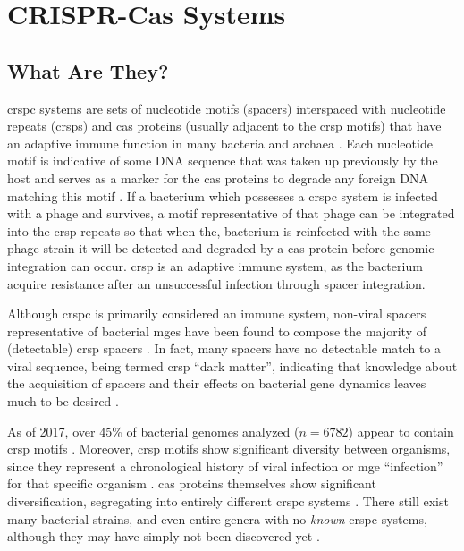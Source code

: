 \section{CRISPR-Cas Systems}
\subsection{What Are They?}
\ac{crspc} systems are sets of nucleotide motifs (spacers) interspaced with nucleotide repeats (\ac{crsp}s) and \ac{cas} proteins (usually adjacent to the \ac{crsp} motifs) that have an adaptive immune function in many bacteria and archaea \citep{crispgen}.
Each nucleotide motif is indicative of some DNA sequence that was taken up previously by the host and serves as a marker for the \ac{cas} proteins to degrade any foreign DNA matching this motif \citep{crispgen}.
If a bacterium which possesses a \ac{crspc} system is infected with a phage and survives, a motif representative of that phage can be integrated into the \ac{crsp} repeats so that when the, bacterium is reinfected with the same phage strain it will be detected and degraded by a \ac{cas} protein before genomic integration can occur.
\ac{crsp} is an adaptive immune system, as the bacterium acquire resistance after an unsuccessful infection through spacer integration.\par
Although \ac{crspc} is primarily considered an immune system, non-viral spacers representative of bacterial \ac{mge}s have been found to compose the majority of (detectable) \ac{crsp} spacers \citep{nonvspacer}.
In fact, many spacers have no detectable match to a viral sequence, being termed \ac{crsp} ``dark matter'', indicating that knowledge about the acquisition of spacers and their effects on bacterial gene dynamics leaves much to be desired \citep{nonvspacer}.\par
As of 2017, over $45\%$ of bacterial genomes analyzed ($n=6782$) appear to contain \ac{crsp} motifs \citep{crispdb}.
Moreover, \ac{crsp} motifs show significant diversity between organisms, since they represent a chronological history of viral infection or \ac{mge} ``infection'' for that specific organism \citep{crispgen}.
\ac{cas} proteins themselves show significant diversification, segregating into entirely different \ac{crspc} systems \citep{evocas}.
There still exist many bacterial strains, and even entire genera with no \textit{known} \ac{crspc} systems, although they may have simply not been discovered yet \citep{ineqcas,casguild}.\par
